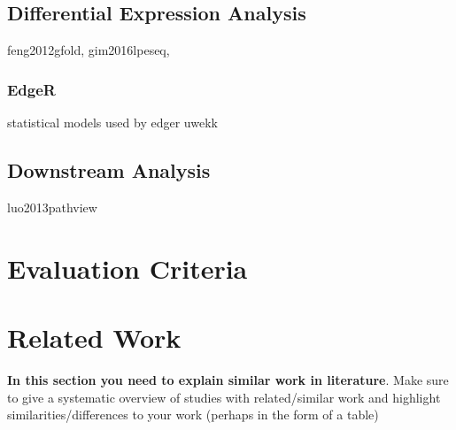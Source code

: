 \subsection{Differential Expression Analysis}
feng2012gfold, gim2016lpeseq, \citep{edger}
%
\subsubsection{EdgeR}

statistical models used by edger uwekk

\subsection{Downstream Analysis}

luo2013pathview

\section{Evaluation Criteria}

\section{Related Work}
\textbf{In this section you need to explain similar work in literature}.  Make sure to give a systematic overview of studies with related/similar work and highlight similarities/differences to your work (perhaps in the form of a table)

